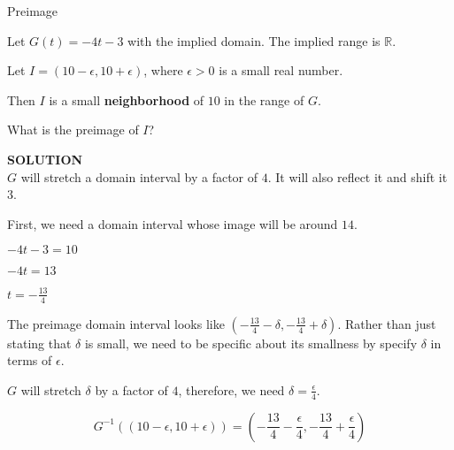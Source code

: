 \documentclass{ximera}
\begin{document}
\begin{example} Preimage

Let $G(t) = -4t - 3$ with the implied domain.  The implied range is $\mathbb{R}$.

Let  $I = (10-\epsilon, 10+\epsilon)$, where $\epsilon > 0$ is a small real number.  

Then $I$ is a small \textbf{neighborhood} of $10$ in the range of $G$.


What is the preimage of $I$?

\textbf{\textcolor{purple!50!blue!90!black}{SOLUTION}} \\





$G$ will stretch a domain interval by a factor of $4$.  It will also reflect it and shift it $3$.  


First, we need a domain interval whose image will be around $14$.

$-4t-3 = 10$

$-4t = 13$

$t = -\frac{13}{4}$



The preimage domain interval looks like $\left( -\frac{13}{4} - \delta, -\frac{13}{4} + \delta \right)$.  Rather than just stating that $\delta$ is small, we need to be specific about its smallness by specify $\delta$ in terms of $\epsilon$.

$G$ will stretch $\delta$ by a factor of $4$, therefore,  we need $\delta = \frac{\epsilon}{4}$. 




\[   G^{-1}((10-\epsilon, 10+\epsilon)) = \left( -\frac{13}{4} - \frac{\epsilon}{4}, -\frac{13}{4} + \frac{\epsilon}{4} \right)   \]



\end{example}
\end{document}
